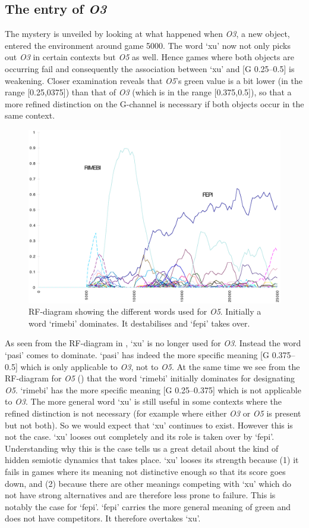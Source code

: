 \subsection{The entry of \emph{O3}}

The mystery is unveiled by looking at what
happened when \emph{O3}, a new object, entered the environment 
around game 5000. The word `xu' now not only picks out
\emph{O3} in certain contexts but \emph{O5} as well. Hence 
games where both objects are occurring fail and consequently 
the association between `xu' and [G 0.25–0.5] is 
weakening. Closer examination reveals that \emph{O5}'s green value
is a bit lower (in the range [0.25,0375]) than that of \emph{O3}
(which is in the range [0.375,0.5]), so that a more refined
distinction on the G-channel is necessary if both objects
occur in the same context. 


\begin{figure}[htbp]
  \centerline{\includegraphics[width=.80\textwidth]{chap7/figs/RF-O5.pdf}}
\caption{\label{RF-O5}RF-diagram showing
the different words used for \emph{O5}. Initially a word 
`rimebi' dominates. It destabilises and `fepi' takes over.}
\end{figure}

As seen from the RF-diagram in , `xu' is no
longer used for \emph{O3}. Instead the word `pasi' comes to 
dominate. `pasi' has indeed the more specific 
meaning [G 0.375–0.5] which is only applicable to \emph{O3}, 
not to \emph{O5}. At the same time we see from the RF-diagram 
for \emph{O5} ()
that the word `rimebi' initially dominates for designating \emph{O5}. 
`rimebi' has the more specific meaning [G 0.25–0.375] which 
is not applicable to \emph{O3}. 
The more general word `xu' is still useful in some 
contexts where the
refined distinction is not necessary (for example where 
either \emph{O3} or \emph{O5} is present but not both). So we would expect
that `xu' continues to exist. However this is not the case. `xu'
looses out completely and its role is taken over by `fepi'. 
\clearpage
Understanding why this is the case
tells us a great detail about the kind 
of hidden semiotic dynamics that takes place. `xu' looses its
strength because (1) it fails in games where its meaning
not distinctive enough so that its score goes
down, and (2) because there 
are other meanings competing with `xu' which do not 
have strong alternatives and are therefore
less prone to failure. This is notably the case for
`fepi'. `fepi' carries the more general meaning of green
and does not have competitors. It therefore overtakes
`xu'. 

